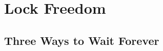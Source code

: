\section{Lock Freedom}
\label{sec:lock-freedom}


\subsection{Three Ways to Wait Forever}
\label{sec:lf-why}


\begin{example}
\label{ex:postpone}

\end{example}

\begin{example}
\label{ex:delegate}

\end{example}



